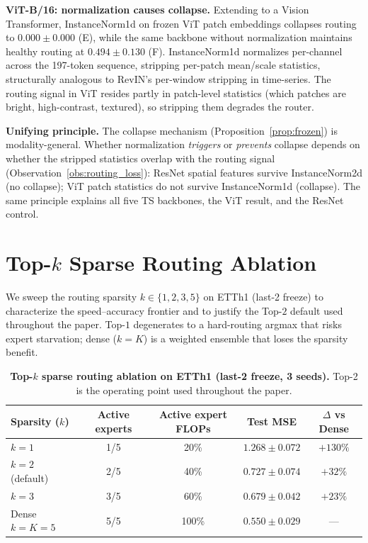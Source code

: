 \documentclass{article}
\begin{document}
\textbf{ViT-B/16: normalization causes collapse.} Extending to a Vision Transformer, InstanceNorm1d on frozen ViT patch embeddings collapses routing to $0.000\pm0.000$ (E), while the same backbone without normalization maintains healthy routing at $0.494\pm0.130$ (F). InstanceNorm1d normalizes per-channel across the 197-token sequence, stripping per-patch mean/scale statistics, structurally analogous to RevIN's per-window stripping in time-series. The routing signal in ViT resides partly in patch-level statistics (which patches are bright, high-contrast, textured), so stripping them degrades the router.

\textbf{Unifying principle.} The collapse mechanism (Proposition~\ref{prop:frozen}) is modality-general. Whether normalization \emph{triggers} or \emph{prevents} collapse depends on whether the stripped statistics overlap with the routing signal (Observation~\ref{obs:routing_loss}): ResNet spatial features survive InstanceNorm2d (no collapse); ViT patch statistics do not survive InstanceNorm1d (collapse). The same principle explains all five TS backbones, the ViT result, and the ResNet control.

\section{Top-$k$ Sparse Routing Ablation}
\label{app:topk}

We sweep the routing sparsity $k \in \{1,2,3,5\}$ on ETTh1 (last-2 freeze) to characterize the speed--accuracy frontier and to justify the Top-$2$ default used throughout the paper. Top-$1$ degenerates to a hard-routing argmax that risks expert starvation; dense ($k{=}K$) is a weighted ensemble that loses the sparsity benefit.

\begin{table}[!htbp]
\centering
\caption{\textbf{Top-$k$ sparse routing ablation on ETTh1 (last-2 freeze, 3 seeds).} Top-2 is the operating point used throughout the paper.}
\label{tab:topk}
\small
\begin{tabular}{@{}lcccc@{}}
\toprule
Sparsity ($k$) & Active experts & Active expert FLOPs & Test MSE & $\Delta$ vs Dense \\
\midrule
$k{=}1$ & 1/5 & 20\% & $1.268 \pm 0.072$ & $+130\%$ \\
$k{=}2$ (default) & 2/5 & 40\% & $\mathbf{0.727 \pm 0.074}$ & $+32\%$ \\
$k{=}3$ & 3/5 & 60\% & $0.679 \pm 0.042$ & $+23\%$ \\
Dense $k{=}K{=}5$ & 5/5 & 100\% & $0.550 \pm 0.029$ & --- \\
\bottomrule
\end{tabular}
\end{table}
\end{document}
